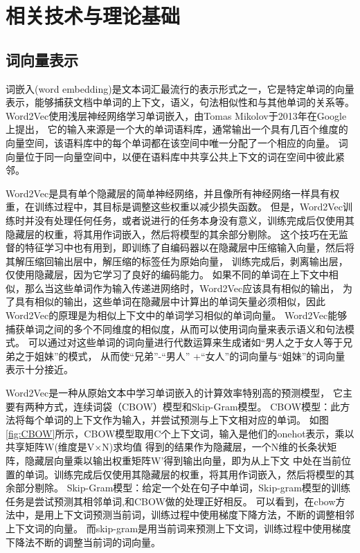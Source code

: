 \chapter{相关技术与理论基础}

\section{词向量表示}

词嵌入(word embedding)是文本词汇最流行的表示形式之一，它是特定单词的向量表示，能够捕获文档中单词的上下文，语义，句法相似性和与其他单词的关系等。
Word2Vec使用浅层神经网络学习单词嵌入，由Tomas Mikolov于2013年在Google上提出\cite{mikolov2013distributed}，
它的输入来源是一个大的单词语料库，通常输出一个具有几百个维度的向量空间，该语料库中的每个单词都在该空间中唯一分配了一个相应的向量。 
词向量位于同一向量空间中，以便在语料库中共享公共上下文的词在空间中彼此紧邻。 

  Word2Vec是具有单个隐藏层的简单神经网络，并且像所有神经网络一样具有权重，在训练过程中，其目标是调整这些权重以减少损失函数。 
  但是，Word2Vec训练时并没有处理任何任务，或者说进行的任务本身没有意义，训练完成后仅使用其隐藏层的权重，将其用作词嵌入，然后将模型的其余部分剔除。
  这个技巧在无监督的特征学习中也有用到，即训练了自编码器以在隐藏层中压缩输入向量，然后将其解压缩回输出层中，解压缩的标签任为原始向量，
  训练完成后，剥离输出层，仅使用隐藏层，因为它学习了良好的编码能力。
  如果不同的单词在上下文中相似，那么当这些单词作为输入传递进网络时，Word2Vec应该具有相似的输出，
  为了具有相似的输出，这些单词在隐藏层中计算出的单词矢量必须相似，因此Word2Vec的原理是为相似上下文中的单词学习相似的单词向量。
Word2Vec能够捕获单词之间的多个不同维度的相似度，从而可以使用词向量来表示语义和句法模式。
可以通过对这些单词的词向量进行代数运算来生成诸如“男人之于女人等于兄弟之于姐妹”的模式，
从而使“兄弟”-“男人” +“女人”的词向量与“姐妹”的词向量表示十分接近。



Word2Vec是一种从原始文本中学习单词嵌入的计算效率特别高的预测模型，
它主要有两种方式，连续词袋（CBOW）模型和Skip-Gram模型。
CBOW模型：此方法将每个单词的上下文作为输入，并尝试预测与上下文相对应的单词。
如图\ref{fig:CBOW}所示，CBOW模型取用C个上下文词，输入是他们的onehot表示，乘以共享矩阵W(维度是V×N)求均值
得到的结果作为隐藏层，一个N维的长条状矩阵，隐藏层向量乘以输出权重矩阵W'得到输出向量，即为从上下文
中处在当前位置的单词。训练完成后仅使用其隐藏层的权重，将其用作词嵌入，然后将模型的其余部分剔除。
Skip-Gram模型：给定一个处在句子中单词，Skip-gram模型的训练任务是尝试预测其相邻单词,和CBOW做的处理正好相反。
可以看到，在cbow方法中，是用上下文词预测当前词，训练过程中使用梯度下降方法，不断的调整相邻上下文词的向量。
而skip-gram是用当前词来预测上下文词，训练过程中使用梯度下降法不断的调整当前词的词向量。

